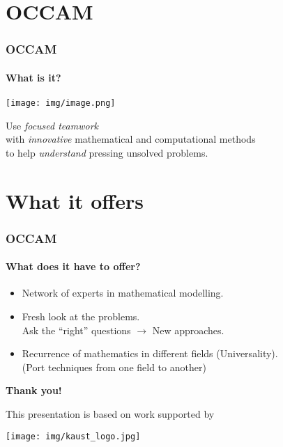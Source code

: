 \documentclass{beamer}
\begin{document}
\section{OCCAM}

\begin{frame}\frametitle{OCCAM}
\framesubtitle{What is it?}

\centerline{\texttt{[image: img/image.png]}}

\bigskip

\pause
Use \emph{focused teamwork}\\
\pause
with \emph{innovative} mathematical and computational methods\\
\pause
to help \emph{understand} pressing unsolved problems.

\bigskip

\end{frame}


\section{What it offers}

\begin{frame}\frametitle{OCCAM}
\framesubtitle{What does it have to offer?}

\begin{itemize}

\item Network of experts in mathematical modelling.
\pause

\item Fresh look at the problems.\\
Ask the ``right'' questions $\to$ New approaches.
\pause

\item Recurrence of mathematics in different fields (Universality).\\
{\tiny (Port techniques from one field to another)}

\end{itemize}

\end{frame}


\begin{frame}
\center

\vfill

{
\Huge%
\textbf{Thank you!}
}

\vfill

{\tiny
This presentation is based on work supported by

\smallskip

\texttt{[image: img/kaust\_logo.jpg]}
}

\end{frame}
\end{document}
